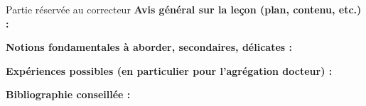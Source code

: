 
\begin{reportBlock}{Partie réservée au correcteur}
  \textbf{Avis général sur la leçon (plan, contenu, etc.) :}
  
  
  \textbf{Notions fondamentales à aborder, secondaires, délicates :}
  
  
  \textbf{Expériences possibles (en particulier pour l'agrégation docteur) :}
  
  
  \textbf{Bibliographie conseillée :}
\end{reportBlock}
